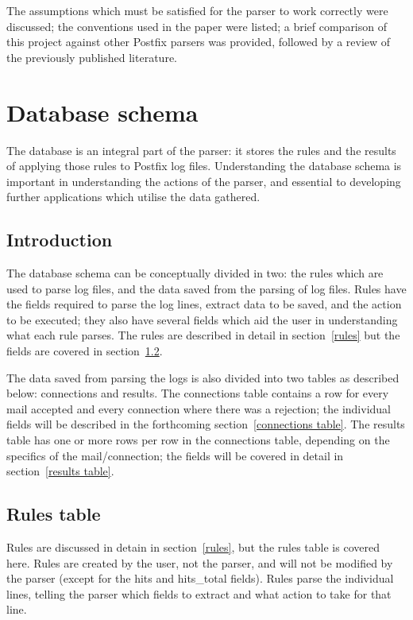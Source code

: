 \documentclass[a4paper,12pt,draft]{article}
\begin{document}
The assumptions which must be satisfied for the parser to work correctly
were discussed; the conventions used in the paper were listed; a brief
comparison of this project against other Postfix parsers was provided,
followed by a review of the previously published literature.

\section{Database schema}
\label{database schema}

The database is an integral part of the parser: it stores the rules and the
results of applying those rules to Postfix log files.  Understanding the
database schema is important in understanding the actions of the parser,
and essential to developing further applications which utilise the data
gathered.

\subsection{Introduction}

The database schema can be conceptually divided in two: the rules which are
used to parse log files, and the data saved from the parsing of log files.
Rules have the fields required to parse the log lines, extract data to be
saved, and the action to be executed; they also have several fields which
aid the user in understanding what each rule parses.  The rules are
described in detail in section~\ref{rules} but the fields are covered in
section~\ref{rule attributes}.

The data saved from parsing the logs is also divided into two tables as
described below: connections and results.  The connections table contains a
row for every mail accepted and every connection where there was a
rejection; the individual fields will be described in the forthcoming
section~\ref{connections table}.  The results table has one or more rows
per row in the connections table, depending on the specifics of the
mail/connection; the fields will be covered in detail in
section~\ref{results table}.

\subsection{Rules table}

\label{rule attributes}

Rules are discussed in detain in section~\ref{rules}, but the rules table
is covered here.  Rules are created by the user, not the parser, and will
not be modified by the parser (except for the hits and hits\_total fields).
Rules parse the individual lines, telling the parser which fields to
extract and what action to take for that line.
\end{document}
